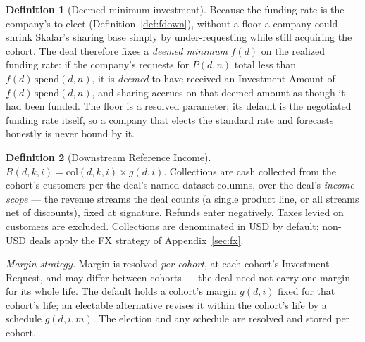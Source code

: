 \documentclass[11pt, a4paper]{article}
\theoremstyle{definition}
\newtheorem{definition}{Definition}[section]
\newcommand{\src}[1]{}
\newcommand{\KCIA}{downstream agreement}
\newcommand{\FudoTS}{downstream term sheet}
\newcommand{\spend}{\mathrm{spend}}               %
\newcommand{\col}{\mathrm{col}}                   %
\begin{document}
\begin{definition}[Deemed minimum investment]\label{def:deemedmin}
Because the funding rate is the company's to elect (Definition~\ref{def:fdown}), without a floor a company could shrink Skalar's sharing base simply by under-requesting while still acquiring the cohort. The deal therefore fixes a \emph{deemed minimum} $\underline{f}(d)$ on the realized funding rate: if the company's requests for $P(d,n)$ total less than $\underline{f}(d)\,\spend(d,n)$, it is \emph{deemed} to have received an Investment Amount of $\underline{f}(d)\,\spend(d,n)$, and sharing accrues on that deemed amount as though it had been funded. The floor is a resolved parameter; its default is the negotiated funding rate itself, so a company that elects the standard rate and forecasts honestly is never bound by it.
\src{\KCIA{} Sch.~A \S2.1(c) (``Minimum Investment Amount'').}
\end{definition}

\begin{definition}[Downstream Reference Income]\label{def:ridown}
$R(d, k, i) = \col(d, k, i) \times g(d,i)$. Collections are cash collected from the cohort's customers per the deal's named dataset columns, over the deal's \emph{income scope} --- the revenue streams the deal counts (a single product line, or all streams net of discounts), fixed at signature. Refunds enter negatively. Taxes levied on customers are excluded. Collections are denominated in USD by default; non-USD deals apply the FX strategy of Appendix~\ref{sec:fx}.

\emph{Margin strategy.} Margin is resolved \emph{per cohort}, at each cohort's Investment Request, and may differ between cohorts --- the deal need not carry one margin for its whole life. The default holds a cohort's margin $g(d,i)$ fixed for that cohort's life; an electable alternative revises it within the cohort's life by a schedule $g(d, i, m)$. The election and any schedule are resolved and stored per cohort.
\src{Template: \KCIA{} Sch.~A (``Collections'', ``Margin'', ``Reference Income''; single-product scope); \FudoTS{} ``Reference Income / Collections'' (all-streams scope, net of discounts).}
\end{definition}
\end{document}
